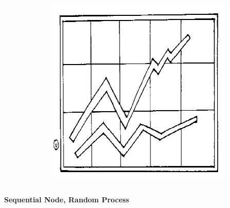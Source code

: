 \documentclass[final]{beamer}
\begin{document}
\begin{frame}[t]
\begin{columns}[t]
\begin{column}{0.60\paperwidth}
\begin{columns}[t,totalwidth=0.60\paperwidth]
\begin{column}{0.28\paperwidth}
\begin{columns}[t,totalwidth=0.28\paperwidth]
\begin{column}{0.12\paperwidth}
							\end{column}
							\begin{column}{0.12\paperwidth}
								\begin{center} \includegraphics[width=0.12\paperwidth]{img/temp} \end{center}
							\end{column}
						\end{columns}
					\end{column}
				\end{columns}
				\begin{columns}[t,totalwidth=0.60\paperwidth]
					\begin{column}{0.28\paperwidth}
						\begin{center} \bf{Sequential Node, Random Process} \end{center}
						\begin{columns}[t,totalwidth=0.28\paperwidth]
							\begin{column}{0.12\paperwidth}

\end{column}
\end{columns}
\end{column}
\end{columns}
\end{column}
\end{columns}
\end{frame}
\end{document}
